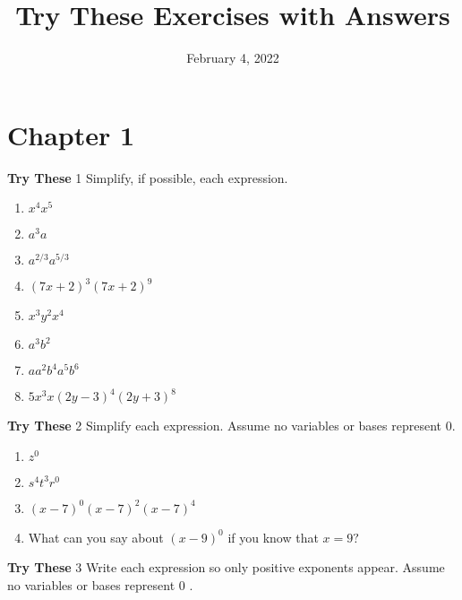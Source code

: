\documentclass[a4paper]{JAC2003}
\begin{document}
\title{Try These Exercises with Answers}


\author{February 4, 2022}

\maketitle

\clearpage
\setlength{\columnseprule}{0.2pt}
\section{Chapter 1}

\noindent\textcolor{red!75!black}{\textbf{Try These}} 1 Simplify, if possible, each expression.

\begin{enumerate}
\item $x^{4} x^{5}$

\item $a^{3} a$

\item $a^{2 / 3} a^{5 / 3}$

\item $(7 x+2)^{3}(7 x+2)^{9}$

\item $x^{3} y^{2} x^{4}$

\item $a^{3} b^{2}$

\item $a a^{2} b^{4} a^{5} b^{6}$

\item $5 x^{3} x(2 y-3)^{4}(2 y+3)^{8}$
\end{enumerate}

\noindent\textcolor{red!75!black}{\textbf{Try These}} 2 Simplify each expression. Assume no variables or bases represent 0.

\begin{enumerate}
\item $z^{0}$

\item $s^{4} t^{3} r^{0}$

\item $(x-7)^{0}(x-7)^{2}(x-7)^{4}$

\item What can you say about $(x-9)^{0}$ if you know that $x=9?$
\end{enumerate}

\noindent\textcolor{red!75!black}{\textbf{Try These}} 3 Write each expression so only positive exponents appear. Assume no variables or bases represent 0 .
\end{document}
